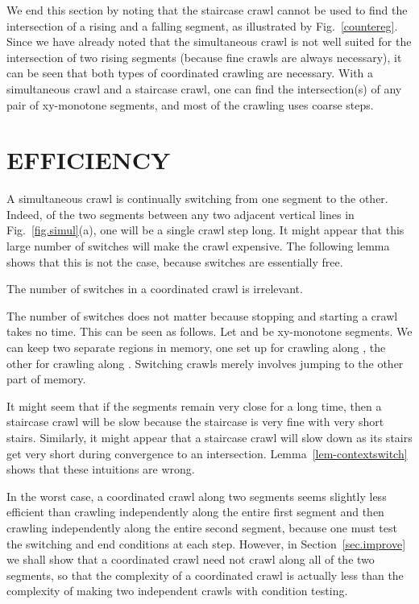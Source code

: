 We end this section by noting
that the staircase crawl cannot be used to find the intersection of a rising and a 
falling segment, as illustrated by Fig.~\ref{countereg}.
Since we have already noted that the simultaneous crawl is not well suited for the 
intersection
of two rising segments (because fine crawls are always necessary),
it can be seen that both types of coordinated crawling are necessary.
With a simultaneous crawl and a staircase crawl, one can find the intersection(s)
of any pair of xy-monotone segments, and most of the crawling uses coarse 
steps.


\section{EFFICIENCY}

A simultaneous crawl is continually switching from one segment to the other.
Indeed, of the two segments between any two adjacent vertical lines
in Fig.~\ref{fig.simul}(a), one will be a single crawl step long.
It might appear that this large number of switches will make the crawl expensive.
The following lemma shows that this is not the case, because switches are essentially free.

\begin{lemma}
\label{lem-contextswitch}
The number of switches in a coordinated crawl is irrelevant.
\end{lemma}
The number of switches does not matter because 
stopping and starting a crawl takes no time.
This can be seen as follows.
Let  and  be xy-monotone segments.
We can keep two separate regions in memory, one set up for crawling
along , the other for crawling along .
Switching crawls merely involves jumping to the other part of memory. 
\QED

It might seem that if the segments remain very close for a long time, then a 
staircase crawl will be slow because the staircase is very fine with very short stairs. 
Similarly, it might appear that a staircase crawl will slow down as its stairs 
get very short during convergence to an intersection.
Lemma~\ref{lem-contextswitch} shows that these intuitions are wrong.

In the worst case, a coordinated crawl along two segments seems slightly less efficient than
crawling independently along the entire first segment and then crawling 
independently along the entire second segment, because one must test
the switching and end conditions at each step.
However, in Section~\ref{sec.improve} we shall show that a coordinated crawl need not 
crawl along all of the two segments,
so that the complexity of a coordinated crawl is actually less than the complexity of 
making two independent crawls with condition testing.

